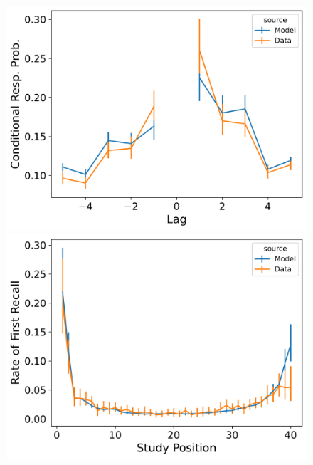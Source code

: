 \documentclass[
  letterpaper,
  11pt,
  english,
  singlespacing,
  headsepline]{MastersDoctoralThesis}
\begin{document}
\begin{figure}

\begin{minipage}{0.33\linewidth}
\includegraphics{icmr_figures/LohnasKahana2014_ConnectionistCMR_Model_Fitting_crp-1.png}\end{minipage}%
%
\begin{minipage}{0.33\linewidth}
\includegraphics{icmr_figures/LohnasKahana2014_ConnectionistCMR_Model_Fitting_pfr-1.png}\end{minipage}%
%
\begin{minipage}{0.33\linewidth}

\end{minipage}
\end{figure}
\end{document}
